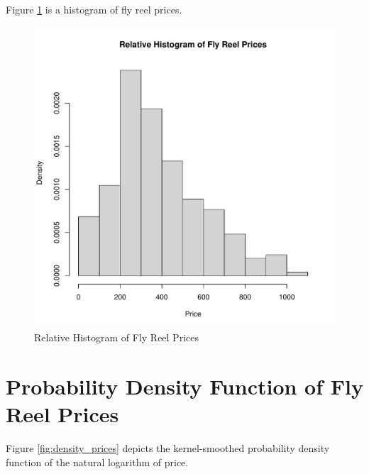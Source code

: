 \documentclass[11pt]{book}
\begin{document}
Figure \ref{fig:hist_prices} is 
a histogram of fly reel prices. 

\begin{figure}[h!]
  \centering
  \includegraphics[scale = 0.5, keepaspectratio=true]{../Figures/hist_prices}
  \caption{Relative Histogram of Fly Reel Prices} \label{fig:hist_prices}
\end{figure}


\pagebreak
\section*{Probability Density Function of Fly Reel Prices}

Figure \ref{fig:density_prices} depicts 
the kernel-smoothed probability density function of the natural logarithm of
price.
\end{document}
